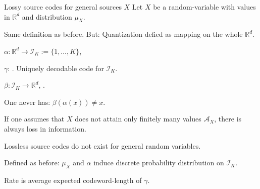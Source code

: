 \begin{frame}{Lossy source codes for general sources $X$} 
Let $X$ be a random-variable with values in $\mathbb{R}^d$ and distribution $\mu_X$. 
\bit
\item Same definition as before. But: Quantization defied as mapping on the whole $\mathbb{R}^d$. 
\item $\alpha: \mathbb{R}^d\to \mathcal{I}_K:=\{1,\dots,K\}$, 
\item $\gamma$: . Uniquely decodable code for $\mathcal{I}_K$. 
\item $\beta: \mathcal{I}_K\to\mathbb{R}^d$, . 
\eit

\bit
\item One never has: $\beta(\alpha(x))\neq x$.
\item[\iarrow] If one assumes that $X$ does not attain only finitely many values $\mathcal{A}_X$,  there is always loss in information.
\item Lossless source codes do not exist for general random variables.
\eit
\vspace{-0.2cm}
\bit
\item Defined as before: $\mu_X$ and $\alpha$ induce discrete probability distribution on $\mathcal{I}_K$. 
\item [\iarrow] Rate is average expected codeword-length of $\gamma$. 
\eit


\end{frame}

